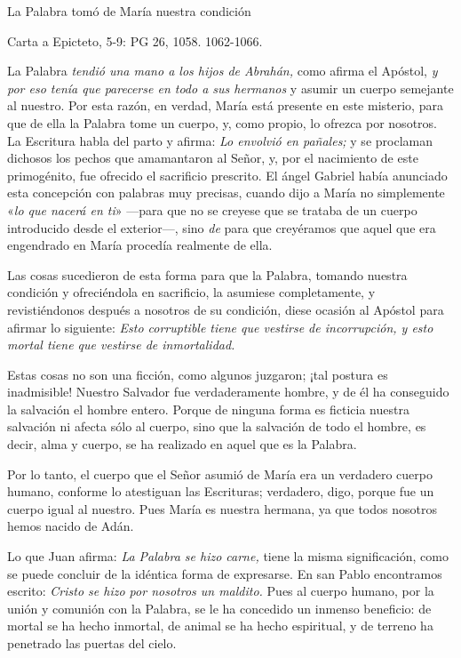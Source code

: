 \documentclass[]{article}
\begin{document}
La Palabra tomó de María nuestra condición

Carta a Epicteto, 5-9: PG 26, 1058. 1062-1066.

La Palabra \emph{tendió una mano a los hijos de Abrahán,} como afirma el
Apóstol, \emph{y por eso tenía que parecerse en todo a sus hermanos} y
asumir un cuerpo semejante al nuestro. Por esta razón, en verdad, María
está presente en este misterio, para que de ella la Palabra tome un
cuerpo, y, como propio, lo ofrezca por nosotros. La Escritura habla del
parto y afirma: \emph{Lo envolvió en pañales;} y se proclaman dichosos
los pechos que amamantaron al Señor, y, por el nacimiento de este
primogénito, fue ofrecido el sacrificio prescrito. El ángel Gabriel
había anunciado esta concepción con palabras muy precisas, cuando dijo a
María no simplemente «\emph{lo que nacerá en ti}» ---para que no se
creyese que se trataba de un cuerpo introducido desde el exterior---,
sino \emph{de} para que creyéramos que aquel que era engendrado en María
procedía realmente de ella.

Las cosas sucedieron de esta forma para que la Palabra, tomando nuestra
condición y ofreciéndola en sacrificio, la asumiese completamente, y
revistiéndonos después a nosotros de su condición, diese ocasión al
Apóstol para afirmar lo siguiente: \emph{Esto corruptible tiene que
vestirse de incorrupción, y esto mortal tiene que vestirse de
inmortalidad.}

Estas cosas no son una ficción, como algunos juzgaron; ¡tal postura es
inadmisible! Nuestro Salvador fue verdaderamente hombre, y de él ha
conseguido la salvación el hombre entero. Porque de ninguna forma es
ficticia nuestra salvación ni afecta sólo al cuerpo, sino que la
salvación de todo el hombre, es decir, alma y cuerpo, se ha realizado en
aquel que es la Palabra.

Por lo tanto, el cuerpo que el Señor asumió de María era un verdadero
cuerpo humano, conforme lo atestiguan las Escrituras; verdadero, digo,
porque fue un cuerpo igual al nuestro. Pues María es nuestra hermana, ya
que todos nosotros hemos nacido de Adán.

Lo que Juan afirma: \emph{La Palabra se hizo carne,} tiene la misma
significación, como se puede concluir de la idéntica forma de
expresarse. En san Pablo encontramos escrito: \emph{Cristo se hizo por
nosotros un maldito.} Pues al cuerpo humano, por la unión y comunión con
la Palabra, se le ha concedido un inmenso beneficio: de mortal se ha
hecho inmortal, de animal se ha hecho espiritual, y de terreno ha
penetrado las puertas del cielo.
\end{document}
